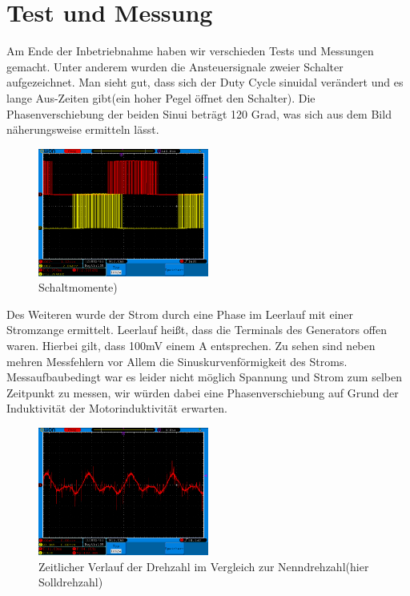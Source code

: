 
\section{Test und Messung}

Am Ende der Inbetriebnahme haben wir verschieden Tests und Messungen gemacht. 
Unter anderem wurden die Ansteuersignale zweier Schalter aufgezeichnet. Man sieht gut, dass sich der Duty Cycle sinuidal verändert und es lange Aus-Zeiten gibt(ein hoher Pegel öffnet den Schalter). Die Phasenverschiebung der beiden Sinui beträgt 120 Grad, was sich aus dem Bild näherungsweise ermitteln lässt.
\begin{figure}[H]
		\includegraphics[width=0.5\textwidth]{uwgeregelt.png}
		\caption{Schaltmomente)}
		\label{fig:rreibChart}
	\end{figure}
	Des Weiteren wurde der Strom durch eine Phase im Leerlauf mit einer Stromzange ermittelt. Leerlauf heißt, dass die Terminals des Generators offen waren. Hierbei gilt, dass 100mV einem A entsprechen. Zu sehen sind neben mehren Messfehlern vor Allem die Sinuskurvenförmigkeit des Stroms. Messaufbaubedingt war es leider nicht möglich Spannung und Strom zum selben Zeitpunkt zu messen, wir würden dabei eine Phasenverschiebung auf Grund der Induktivität der Motorinduktivität erwarten.  
	\begin{figure}[H]
		\includegraphics[width=0.5\textwidth]{strom1Phase.png}
		\caption{Zeitlicher Verlauf der Drehzahl im Vergleich zur Nenndrehzahl(hier Solldrehzahl)}
		\label{fig:rreibChart}
	\end{figure}